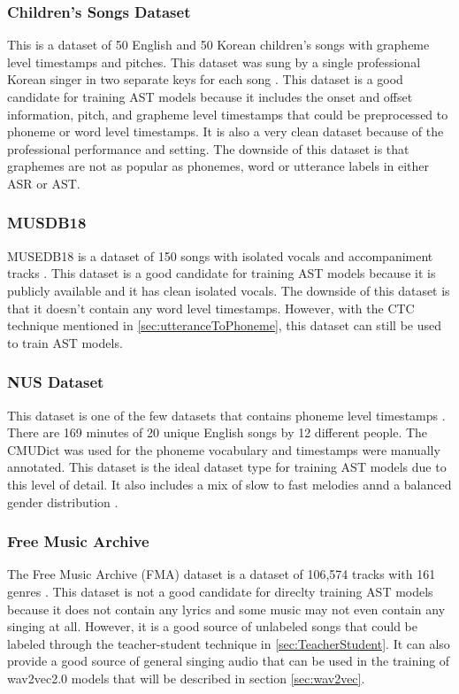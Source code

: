 \documentclass[letterpaper, 12pt]{article}
\begin{document}
\begin{multicols*}{2}
\subsubsection{Children's Songs Dataset}
This is a dataset of 50 English and 50 Korean children's songs with grapheme level timestamps and
pitches. This dataset was sung by a single professional Korean singer in two separate keys for each
song \citep{CSD}. This dataset is a good candidate for training AST models because it
includes the onset and offset information, pitch, and grapheme level timestamps that could be
preprocessed to phoneme or word level timestamps. It is also a very clean dataset because of the
professional performance and setting. The downside of this dataset is that graphemes are
not as popular as phonemes, word or utterance labels in either ASR or AST.

\subsubsection{MUSDB18}
MUSEDB18 is a dataset of 150 songs with isolated vocals and accompaniment tracks \citep{musdb18}. This
dataset is a good candidate for training AST models because it is publicly available and it has
clean isolated vocals. The downside of this dataset is that it doesn't contain any word level
timestamps. However, with the CTC technique mentioned in \ref{sec:utteranceToPhoneme}, this dataset
can still be used to train AST models.

\subsubsection{NUS Dataset}
This dataset is one of the few datasets that contains phoneme level timestamps \citep{NUSDataset}.
There are 169 minutes of 20 unique English songs by 12 different people. The CMUDict was used
for the phoneme vocabulary and timestamps were manually annotated. This dataset is the ideal dataset
type for training AST models due to this level of detail. It also includes a mix of slow to fast
melodies annd a balanced gender distribution \citep{NUSDataset}.


\subsubsection{Free Music Archive}
The Free Music Archive (FMA) dataset is a dataset of 106,574 tracks with 161 genres \citep{FMA}. This
dataset is not a good candidate for direclty training AST models because it does not contain any lyrics
and some music may not even contain any singing at all. However, it is a good source of unlabeled
songs that could be labeled through the teacher-student technique in \ref{sec:TeacherStudent}. It
can also provide a good source of general singing audio that can be used in the
training of wav2vec2.0 models that will be described in section \ref{sec:wav2vec}.


\end{multicols*}
\end{document}
